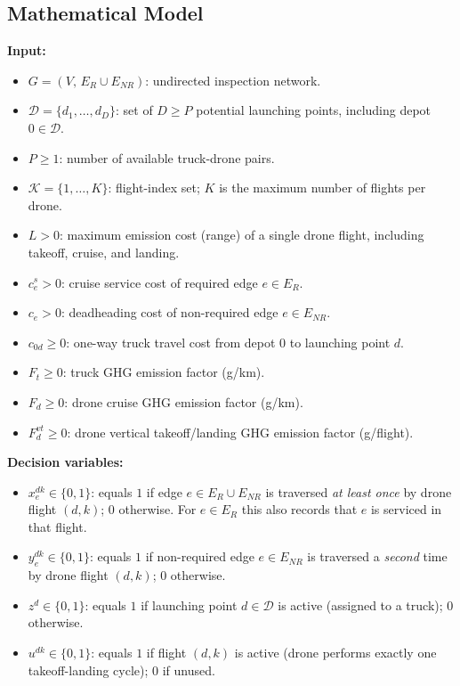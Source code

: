\documentclass[a4paper,fleqn]{cas-dc}
\begin{document}
\subsection{Mathematical Model}

\textbf{Input:}
\begin{itemize}
 \item $G = (V,\, E_R \cup E_{NR})$: undirected inspection network.
 \item $\mathcal{D} = \{d_1, \ldots, d_D\}$: set of $D \geq P$ potential launching points, including depot $0 \in \mathcal{D}$.
 \item $P \geq 1$: number of available truck-drone pairs.
 \item $\mathcal{K} = \{1, \ldots, K\}$: flight-index set; $K$ is the maximum number of flights per drone.
 \item $L > 0$: maximum emission cost (range) of a single drone flight, including takeoff, cruise, and landing.
 \item $c^s_e > 0$: cruise service cost of required edge $e \in E_R$.
 \item $c_e > 0$: deadheading cost of non-required edge $e \in E_{NR}$.
 \item $c_{0d} \geq 0$: one-way truck travel cost from depot $0$ to launching point $d$.
 \item $F_t \geq 0$: truck GHG emission factor (g/km).
 \item $F_d \geq 0$: drone cruise GHG emission factor (g/km).
 \item $F_d^{vt} \geq 0$: drone vertical takeoff/landing GHG emission factor (g/flight).
\end{itemize}

\textbf{Decision variables:}
\begin{itemize}
 \item $x^{dk}_e \in \{0,1\}$: equals $1$ if edge $e \in E_R \cup E_{NR}$ is traversed \emph{at least once} by drone flight $(d,k)$; $0$ otherwise. For $e \in E_R$ this also records that $e$ is serviced in that flight. 
\item $y^{dk}_e \in \{0,1\}$: equals $1$ if non-required edge $e \in E_{NR}$ is traversed a \emph{second} time by drone flight $(d,k)$; $0$ otherwise. 
\item $z^d \in \{0,1\}$: equals $1$ if launching point $d \in \mathcal{D}$ is active (assigned to a truck); $0$ otherwise. 
\item $u^{dk} \in \{0,1\}$: equals $1$ if flight $(d,k)$ is active (drone performs exactly one takeoff-landing cycle); $0$ if unused.
\end{itemize}
\end{document}
